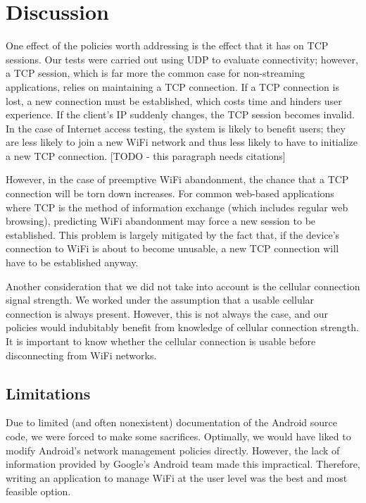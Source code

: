 \section{Discussion}
\label{sec:disc}

One effect of the policies worth addressing is the effect that it has on TCP sessions. Our tests were carried out using UDP to evaluate connectivity; however, a TCP session, which is far more the common case for non-streaming applications, relies on maintaining a TCP connection. If a TCP connection is lost, a new connection must be established, which costs time and hinders user experience. If the client's IP suddenly changes, the TCP session becomes invalid. In the case of Internet access testing, the system is likely to benefit users; they are less likely to join a new WiFi network and thus less likely to have to initialize a new TCP connection. [TODO - this paragraph needs citations]

However, in the case of preemptive WiFi abandonment, the chance that a TCP connection will be torn down increases. For common web-based applications where TCP is the method of information exchange (which includes regular web browsing), predicting WiFi abandonment may force a new session to be established. This problem is largely mitigated by the fact that, if the device's connection to WiFi is about to become unusable, a new TCP connection will have to be established anyway.

Another consideration that we did not take into account is the cellular connection signal strength. We worked under the assumption that a usable cellular connection is always present. However, this is not always the case, and our policies would indubitably benefit from knowledge of cellular connection strength. It is important to know whether the cellular connection is usable before disconnecting from WiFi networks.

\subsection{Limitations}

Due to limited (and often nonexistent) documentation of the Android source code, we were forced to make some sacrifices. Optimally, we would have liked to modify Android's network management policies directly. However, the lack of information provided by Google's Android team made this impractical. Therefore, writing an application to manage WiFi at the user level was the best and most feasible option.


